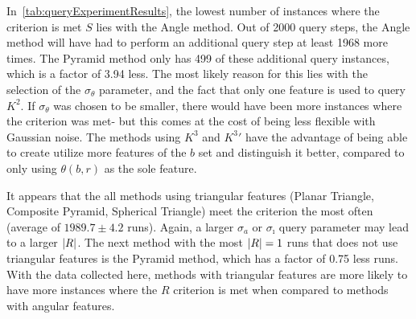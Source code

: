 In~\autoref{tab:queryExperimentResults}, the lowest number of instances where the criterion is met $S$ lies with the
Angle method.
Out of 2000 query steps, the Angle method will have had to perform an additional query step at least 1968 more times.
The Pyramid method only has 499 of these additional query instances, which is a factor of 3.94 less.
The most likely reason for this lies with the selection of the $\sigma_\theta$ parameter, and the fact that only one
feature is used to query $K^2$.
If $\sigma_\theta$ was chosen to be smaller, there would have been more instances where the criterion was met- but
this comes at the cost of being less flexible with Gaussian noise.
The methods using $K^3$ and $K^3'$ have the advantage of being able to create utilize more features of the $b$ set and
distinguish it better, compared to only using $\theta(b, r)$ as the sole feature.

It appears that the all methods using triangular features (Planar Triangle, Composite Pyramid, Spherical Triangle)
meet the criterion the most often (average of $1989.7 \pm 4.2$ runs).
Again, a larger $\sigma_a$ or $\sigma_\imath$ query parameter may lead to a larger $\left| R \right|$.
The next method with the most $\left| R \right| = 1$ runs that does not use triangular features is the Pyramid method,
which has a factor of 0.75 less runs.
With the data collected here, methods with triangular features are more likely to have more instances where the
$R$ criterion is met when compared to methods with angular features.

